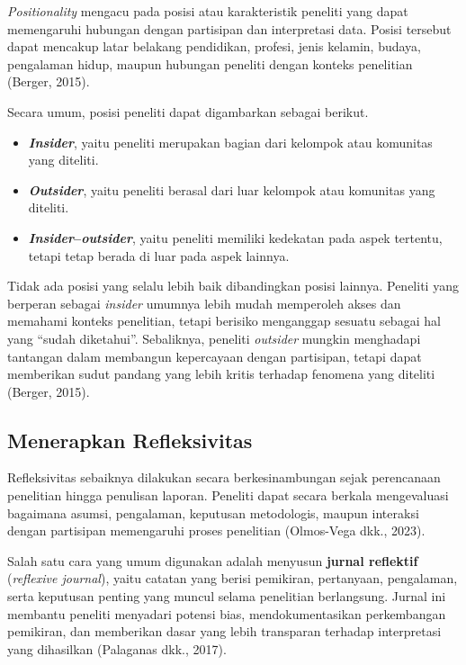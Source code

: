 \documentclass[
  indonesian,
  letterpaper,
  DIV=11,
  numbers=noendperiod]{scrreprt}
\providecommand{\tightlist}{%
  \setlength{\itemsep}{0pt}\setlength{\parskip}{0pt}}
\begin{document}
\emph{Positionality} mengacu pada posisi atau karakteristik peneliti
yang dapat memengaruhi hubungan dengan partisipan dan interpretasi data.
Posisi tersebut dapat mencakup latar belakang pendidikan, profesi, jenis
kelamin, budaya, pengalaman hidup, maupun hubungan peneliti dengan
konteks penelitian (Berger, 2015).

Secara umum, posisi peneliti dapat digambarkan sebagai berikut.

\begin{itemize}
\tightlist
\item
  \textbf{\emph{Insider}}, yaitu peneliti merupakan bagian dari kelompok
  atau komunitas yang diteliti.
\item
  \textbf{\emph{Outsider}}, yaitu peneliti berasal dari luar kelompok
  atau komunitas yang diteliti.
\item
  \textbf{\emph{Insider}--\emph{outsider}}, yaitu peneliti memiliki
  kedekatan pada aspek tertentu, tetapi tetap berada di luar pada aspek
  lainnya.
\end{itemize}

Tidak ada posisi yang selalu lebih baik dibandingkan posisi lainnya.
Peneliti yang berperan sebagai \emph{insider} umumnya lebih mudah
memperoleh akses dan memahami konteks penelitian, tetapi berisiko
menganggap sesuatu sebagai hal yang ``sudah diketahui''. Sebaliknya,
peneliti \emph{outsider} mungkin menghadapi tantangan dalam membangun
kepercayaan dengan partisipan, tetapi dapat memberikan sudut pandang
yang lebih kritis terhadap fenomena yang diteliti (Berger, 2015).

\subsection{Menerapkan Refleksivitas}\label{menerapkan-refleksivitas}

Refleksivitas sebaiknya dilakukan secara berkesinambungan sejak
perencanaan penelitian hingga penulisan laporan. Peneliti dapat secara
berkala mengevaluasi bagaimana asumsi, pengalaman, keputusan
metodologis, maupun interaksi dengan partisipan memengaruhi proses
penelitian (Olmos-Vega dkk., 2023).

Salah satu cara yang umum digunakan adalah menyusun \textbf{jurnal
reflektif} (\emph{reflexive journal}), yaitu catatan yang berisi
pemikiran, pertanyaan, pengalaman, serta keputusan penting yang muncul
selama penelitian berlangsung. Jurnal ini membantu peneliti menyadari
potensi bias, mendokumentasikan perkembangan pemikiran, dan memberikan
dasar yang lebih transparan terhadap interpretasi yang dihasilkan
(Palaganas dkk., 2017).
\end{document}
